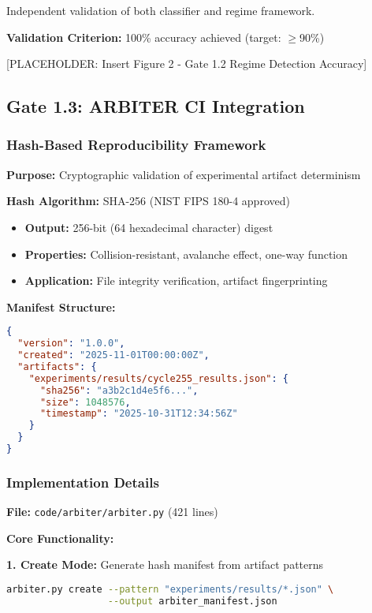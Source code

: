 \documentclass[11pt]{article}
\begin{document}
Independent validation of both classifier and regime framework.

\textbf{Validation Criterion:} 100\% accuracy achieved (target: $\geq$90\%)

[PLACEHOLDER: Insert Figure 2 - Gate 1.2 Regime Detection Accuracy]

\subsection{Gate 1.3: ARBITER CI Integration}

\subsubsection{Hash-Based Reproducibility Framework}

\textbf{Purpose:} Cryptographic validation of experimental artifact determinism

\textbf{Hash Algorithm:} SHA-256 (NIST FIPS 180-4 approved)
\begin{itemize}
\item \textbf{Output:} 256-bit (64 hexadecimal character) digest
\item \textbf{Properties:} Collision-resistant, avalanche effect, one-way function
\item \textbf{Application:} File integrity verification, artifact fingerprinting
\end{itemize}

\textbf{Manifest Structure:}
\begin{lstlisting}[language=json]
{
  "version": "1.0.0",
  "created": "2025-11-01T00:00:00Z",
  "artifacts": {
    "experiments/results/cycle255_results.json": {
      "sha256": "a3b2c1d4e5f6...",
      "size": 1048576,
      "timestamp": "2025-10-31T12:34:56Z"
    }
  }
}
\end{lstlisting}

\subsubsection{Implementation Details}

\textbf{File:} \texttt{code/arbiter/arbiter.py} (421 lines)

\textbf{Core Functionality:}

\textbf{1. Create Mode:} Generate hash manifest from artifact patterns
\begin{lstlisting}[language=bash]
arbiter.py create --pattern "experiments/results/*.json" \
                  --output arbiter_manifest.json
\end{lstlisting}
\end{document}
